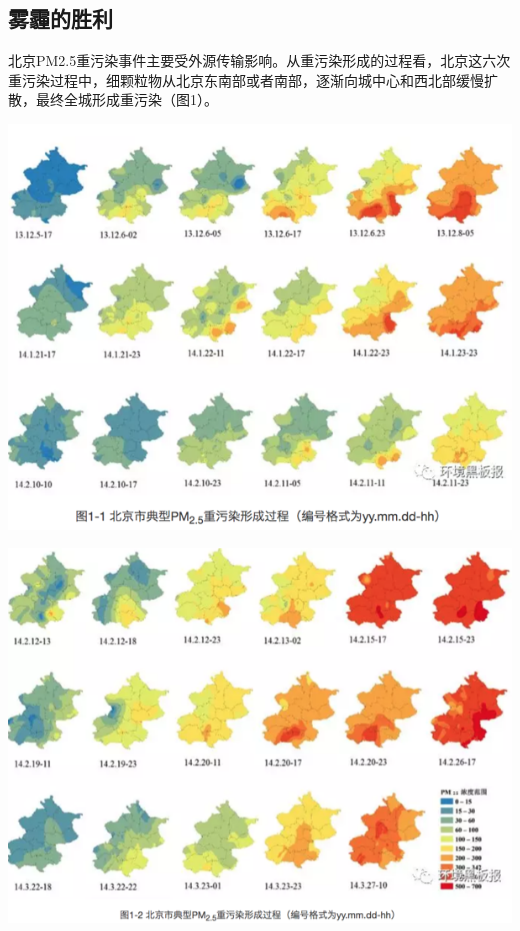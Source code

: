 \documentclass[]{book}
\begin{document}
\hypertarget{ux96feux973eux7684ux80dcux5229}{%
\subsection{雾霾的胜利}\label{ux96feux973eux7684ux80dcux5229}}

北京PM2.5重污染事件主要受外源传输影响。从重污染形成的过程看，北京这六次重污染过程中，细颗粒物从北京东南部或者南部，逐渐向城中心和西北部缓慢扩散，最终全城形成重污染（图1）。

\includegraphics[width=8.33in]{images/windhaze1}

\includegraphics[width=8.33in]{images/windhaze2}
\end{document}
